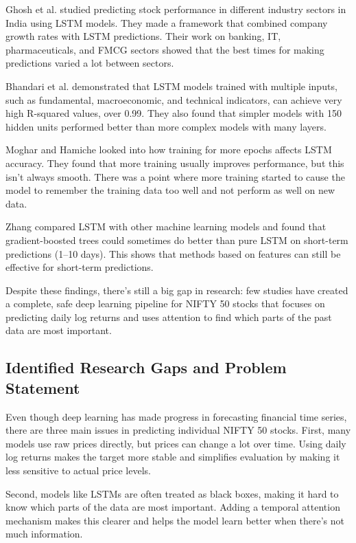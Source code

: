 \documentclass[conference]{IEEEtran}
\begin{document}
Ghosh et al. \cite{b3} studied predicting stock performance in different industry sectors in India using LSTM models. They made a framework that combined company growth rates with LSTM predictions. Their work on banking, IT, pharmaceuticals, and FMCG sectors showed that the best times for making predictions varied a lot between sectors.

Bhandari et al. \cite{b1} demonstrated that LSTM models trained with multiple inputs, such as fundamental, macroeconomic, and technical indicators, can achieve very high R-squared values, over 0.99. They also found that simpler models with 150 hidden units performed better than more complex models with many layers.

Moghar and Hamiche \cite{b6} looked into how training for more epochs affects LSTM accuracy. They found that more training usually improves performance, but this isn't always smooth. There was a point where more training started to cause the model to remember the training data too well and not perform as well on new data.

Zhang \cite{b9} compared LSTM with other machine learning models and found that gradient-boosted trees could sometimes do better than pure LSTM on short-term predictions (1--10 days). This shows that methods based on features can still be effective for short-term predictions.

Despite these findings, there's still a big gap in research: few studies have created a complete, safe deep learning pipeline for NIFTY 50 stocks that focuses on predicting daily log returns and uses attention to find which parts of the past data are most important.

\subsection{Identified Research Gaps and Problem Statement}

Even though deep learning has made progress in forecasting financial time series, there are three main issues in predicting individual NIFTY 50 stocks. First, many models use raw prices directly, but prices can change a lot over time. Using daily log returns makes the target more stable and simplifies evaluation by making it less sensitive to actual price levels.

Second, models like LSTMs are often treated as black boxes, making it hard to know which parts of the data are most important. Adding a temporal attention mechanism makes this clearer and helps the model learn better when there's not much information.
\end{document}
